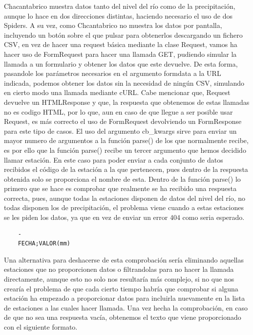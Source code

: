 Chacantabrico muestra datos tanto del nivel del río como de la precipitación, aunque lo hace en dos direcciones distintas, haciendo necesario el uso de dos Spiders.\newline
\newline
A su vez, como Chcantabrico no muestra los datos por pantalla, incluyendo un botón sobre el que pulsar para obtenerlos descargando un fichero CSV, en vez de hacer una request básica mediante la clase Request, vamos ha hacer uso de FormRequest para hacer una llamada GET, pudiendo simular la llamada a un formulario y obtener los datos que este devuelve. De esta forma, pasandole los parámetros necesarios en el argumento formdata a la URL indicada, podemos obtener los datos sin la necesidad de ningún CSV, simulando en cierto modo una llamada mediante cURL. Cabe mencionar que, Request devuelve un HTMLResponse y que, la respuesta que obtenemos de estas llamadas no es codigo HTML, por lo que, aun en caso de que llegue a ser posible usar Request, es más correcto el uso de FormRequest devolviendo un FormResponse para este tipo de casos.\newline
\newline
El uso del argumento cb\_kwargs sirve para enviar un mayor numero de argumentos a la función parse() de los que normalmente recibe, es por ello que la función parse() recibe un tercer argumento que hemos decidido llamar estación. En este caso para poder enviar a cada conjunto de datos recibidos el código de la estación a la que pertenecen, pues dentro de la respuesta obtenida solo se proporciona el nombre de esta.\newline
\newline
Dentro de la función parse() lo primero que se hace es comprobar que realmente se ha recibido una respuesta correcta, pues, aunque todas la estaciones disponen de datos del nivel del río, no todas disponen los de precipitación, el problema viene cuando a estas estaciones se les piden los datos, ya que en vez de enviar un error 404 como seria esperado.

\begin{verbatim}
	-
	FECHA;VALOR(mm)
\end{verbatim}

Una alternativa para deshacerse de esta comprobación sería eliminando aquellas estaciones que no proporcionen datos o filtrandolas para no hacer la llamada directamente, aunque esto no solo nos resultaría más complejo, si no que nos crearía el problema de que cada cierto tiempo habría que comprobar si alguna estación ha empezado a proporcionar datos para incluirla nuevamente en la lista de estaciones a las cuales hacer llamada.\newline
\newline
Una vez hecha la comprobación, en caso de que no sea una respuesta vacía, obtenemos el texto que viene proporcionado con el siguiente formato.

